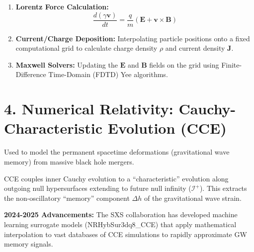 \documentclass{article}
\begin{document}
\begin{enumerate}
    \item \textbf{Lorentz Force Calculation:} 
    \begin{equation}
        \frac{d(\gamma \mathbf{v})}{dt} = \frac{q}{m} (\mathbf{E} + \mathbf{v} \times \mathbf{B})
    \end{equation}
    \item \textbf{Current/Charge Deposition:} Interpolating particle positions onto a fixed computational grid to calculate charge density $\rho$ and current density $\mathbf{J}$.
    \item \textbf{Maxwell Solvers:} Updating the $\mathbf{E}$ and $\mathbf{B}$ fields on the grid using Finite-Difference Time-Domain (FDTD) Yee algorithms.
\end{enumerate}

\section*{4. Numerical Relativity: Cauchy-Characteristic Evolution (CCE)}
Used to model the permanent spacetime deformations (gravitational wave memory) from massive black hole mergers.

CCE couples inner Cauchy evolution to a ``characteristic'' evolution along outgoing null hypersurfaces extending to future null infinity ($\mathscr{I}^+$). This extracts the non-oscillatory ``memory'' component $\Delta h$ of the gravitational wave strain.

\textbf{2024-2025 Advancements:} The SXS collaboration has developed machine learning surrogate models (NRHybSur3dq8\_CCE) that apply mathematical interpolation to vast databases of CCE simulations to rapidly approximate GW memory signals.
\end{document}
